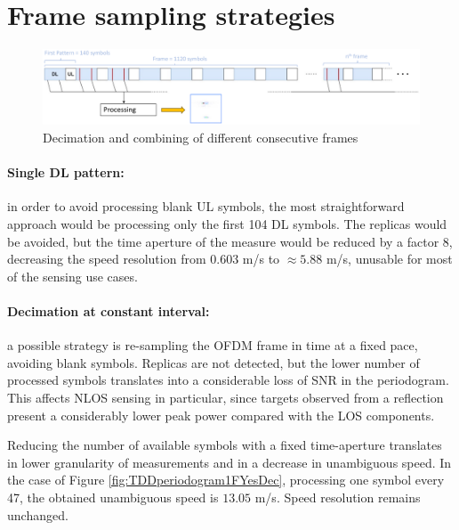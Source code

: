 \section{Frame sampling strategies}

    \begin{figure}[H]
        \centering
        \includegraphics[width=1\textwidth]{Images/TDDprocessing/TDDstrategies.eps}
        \caption{Decimation and combining of different consecutive frames}
        \label{fig:TDDstrategies}
    \end{figure}

    \paragraph{Single DL pattern:}
    in order to avoid processing blank UL symbols, the most straightforward approach would be processing only the first 104 DL symbols. The replicas would be avoided, but the time aperture of the measure would be reduced by a factor 8, decreasing the speed resolution from $0.603$ m/s to $\approx 5.88$ m/s, unusable for most of the sensing use cases.
    
    \paragraph{Decimation at constant interval:}
     a possible strategy is re-sampling the OFDM frame in time at a fixed pace, avoiding blank symbols. Replicas are not detected, but the lower number of processed symbols translates into a considerable loss of SNR in the periodogram. This affects NLOS sensing in particular, since targets observed from a reflection present a considerably lower peak power compared with the LOS components.

     Reducing the number of available symbols with a fixed time-aperture translates in lower granularity of measurements and in a decrease in unambiguous speed. \protect\newline In the case of Figure \ref{fig:TDDperiodogram1FYesDec}, processing one symbol every 47, the obtained unambiguous speed is $13.05$ m/s. \protect\newline Speed resolution remains unchanged.
    

